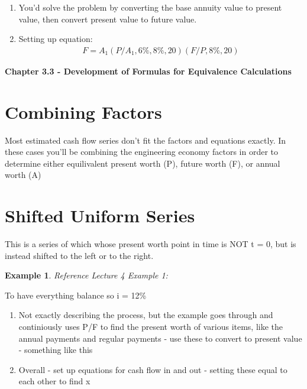 \documentclass{report} %
\newtheorem{exmp}{Example}
\begin{document}
\begin{enumerate}
    \item You'd solve the problem by converting the base annuity value to present value, then convert present value to future value.
    \item Setting up equation:
    \begin{equation*}
        \begin{aligned}
            F = A_1(P/A_1,6\%,8\%,20)(F/P,8\%,20)
        \end{aligned}
    \end{equation*}
\end{enumerate}
\begin{center}
    \LARGE{\textbf{Chapter 3.3 - Development of Formulas for Equivalence Calculations}}
\end{center}

\section*{Combining Factors}
Most estimated cash flow series don't fit the factors and equations exactly. In these cases you'll be combining the engineering economy factors in order to determine either equilivalent present worth (P), future worth (F), or annual worth (A)

\section*{Shifted Uniform Series}
This is a series of which whose present worth point in time is NOT t = 0, but is instead shifted to the left or to the right.

\begin{exmp}
    Reference Lecture 4 Example 1: \\
\end{exmp}
To have everything balance so i = 12\% 
\begin{enumerate}
    \item Not exactly describing the process, but the example goes through and continiously uses P/F to find the present worth of various items, like the annual payments and regular payments - use these to convert to present value - something like this %
    \item Overall - set up equations for cash flow in and out - setting these equal to each other to find x
\end{enumerate}
\end{document}
